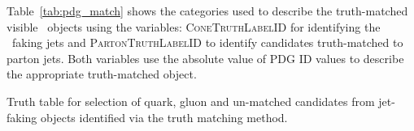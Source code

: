 	Table~\ref{tab:pdg_match} shows the categories used to describe the truth-matched visible \htau\ objects using the variables: \textsc{ConeTruthLabelID} for identifying the \htau\ faking jets and \textsc{PartonTruthLabelID} to identify \htau candidates truth-matched to parton jets. 
	Both variables use the absolute value of \ac{PDG ID} values to describe the appropriate truth-matched object. 
	\begin{table}[!hbt]
	\caption{Truth table for selection of quark, gluon and un-matched candidates from jet-faking \htau objects identified via the truth matching method.}
	\begin{center}
	
	\end{center}
	\label{tab:pdg_match}
	\end{table}
	
